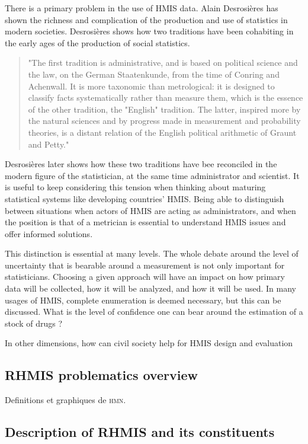 \documentclass[a4paper,11pt,final,twoside]{article}
\begin{document}
There is a primary problem in the use of HMIS data. Alain Desrosières has shown the richness and complication of the production and use of statistics in modern societies. Desrosières shows how two traditions have been cohabiting in the early ages of the production of social statistics\cite{admin_savant}. 

\begin{quote}
"The first tradition is administrative, and is based on political science and the law, on the German Staatenkunde, from the time of Conring and Achenwall. It is more taxonomic than metrological: it is designed to classify facts systematically rather than measure them, which is the essence of the other tradition, the "English" tradition. The latter, inspired more by the natural sciences and by progress made in measurement and probability theories, is a distant relation of the English political arithmetic of Graunt and Petty."
\end{quote}

Desrosières later shows how these two traditions have bee reconciled in the modern figure of the statistician, at the same time administrator and scientist. It is useful to keep considering this tension when thinking about maturing statistical systems like developing countries' HMIS. Being able to distinguish between situations when actors of HMIS are acting as administrators, and when the position is that of a metrician is essential to understand HMIS issues and offer informed solutions. 

This distinction is essential at many levels. The whole debate around the level of uncertainty that is bearable around a measurement is not only important for statisticians. Choosing a given approach will have an impact on how primary data will be collected, how it will be analyzed, and how it will be used. In many usages of HMIS, complete enumeration is deemed necessary, but this can be discussed. What is the level of confidence one can bear around the estimation of a stock of drugs ?

In other dimensions, how can civil society help for HMIS design and evaluation


	\subsection{RHMIS problematics overview}

Definitions et graphiques de \textsc{hmn}.

	\subsection{Description of RHMIS and its constituents}
\end{document}
